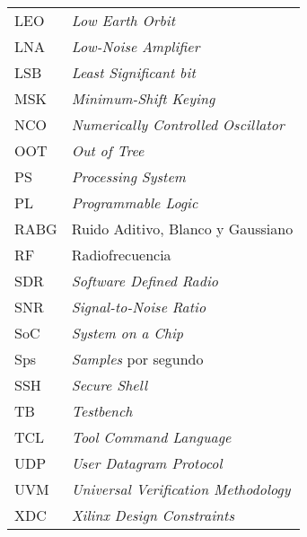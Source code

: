 \documentclass[screen, pagebackref,oneside]{ibtesis}
\begin{document}
\begin{preliminary}
\begin{abreviaturas}
\begin{longtable}{ll}
            LEO &   \textit{Low Earth Orbit}        \\
            LNA &   \textit{Low-Noise Amplifier}    \\
            LSB &   \textit{Least Significant bit}  \\
            MSK &   \textit{Minimum-Shift Keying}  \\
            NCO &   \textit{Numerically Controlled Oscillator}  \\
            OOT &   \textit{Out of Tree}    \\
            PS  &   \textit{Processing System}  \\
            PL  &   \textit{Programmable Logic} \\
            RABG &  Ruido Aditivo, Blanco y Gaussiano   \\
            RF  &   Radiofrecuencia                 \\
            SDR &   \textit{Software Defined Radio} \\
            SNR &   \textit{Signal-to-Noise Ratio}  \\
            SoC &   \textit{System on a Chip}       \\
            Sps &   \textit{Samples} por segundo   \\
            SSH &   \textit{Secure Shell}   \\
            TB  &   \textit{Testbench}  \\
            TCL &   \textit{Tool Command Language}  \\
            UDP &   \textit{User Datagram Protocol} \\
            UVM &   \textit{Universal Verification Methodology} \\
            XDC &   \textit{Xilinx Design Constraints}
        \end{longtable}
    \end{abreviaturas}
    
    \tableofcontents                %
    \listoffigures                  %
    \listoftables                   %
    
    
\end{preliminary}










\end{document}
